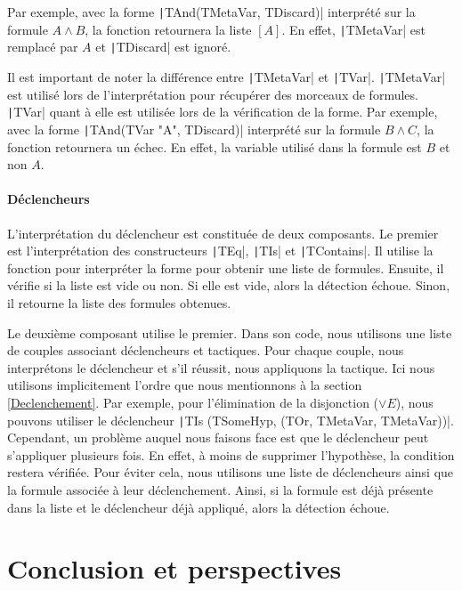 \documentclass[french,titlepage]{article}
\begin{document}
Par exemple, avec la forme \texttt|TAnd(TMetaVar, TDiscard)| interprété sur la formule $A \land B$, la fonction retournera la liste $[A]$. En effet, \texttt|TMetaVar| est remplacé par $A$ et \texttt|TDiscard| est ignoré.

Il est important de noter la différence entre \texttt|TMetaVar| et \texttt|TVar|. \texttt|TMetaVar| est utilisé lors de l'interprétation pour récupérer des morceaux de formules. \texttt|TVar| quant à elle est utilisée lors de la vérification de la forme. Par exemple, avec la forme \texttt|TAnd(TVar "A", TDiscard)| interprété sur la formule $B \land C$, la fonction retournera un échec. En effet, la variable utilisé dans la formule est $B$ et non $A$.

\paragraph{Déclencheurs}
L'interprétation du déclencheur est constituée de deux composants. Le premier est l'interprétation des constructeurs \texttt|TEq|, \texttt|TIs| et \texttt|TContains|. Il utilise la fonction pour interpréter la forme pour obtenir une liste de formules. Ensuite, il vérifie si la liste est vide ou non. Si elle est vide, alors la détection échoue. Sinon, il retourne la liste des formules obtenues.

Le deuxième composant utilise le premier. Dans son code, nous utilisons une liste de couples associant déclencheurs et tactiques. Pour chaque couple, nous interprétons le déclencheur et s'il réussit, nous appliquons la tactique. Ici nous utilisons implicitement l'ordre que nous mentionnons à la section \ref{Declenchement}. Par exemple, pour l'élimination de la disjonction ($\lor E$), nous pouvons utiliser le déclencheur \texttt|TIs (TSomeHyp, (TOr, TMetaVar, TMetaVar))|. Cependant, un problème auquel nous faisons face est que le déclencheur peut s'appliquer plusieurs fois. En effet, à moins de supprimer l'hypothèse, la condition restera vérifiée. Pour éviter cela, nous utilisons une liste de déclencheurs ainsi que la formule associée à leur déclenchement. Ainsi, si la formule est déjà présente dans la liste et le déclencheur déjà appliqué, alors la détection échoue.



\section{Conclusion et perspectives}
\end{document}
